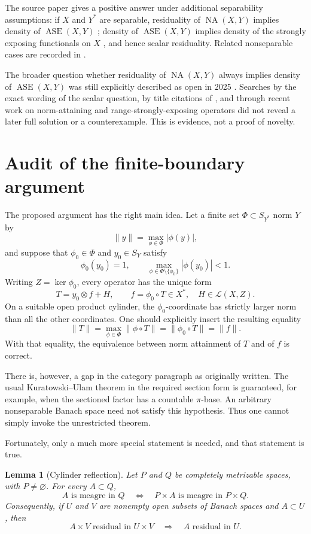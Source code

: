 \documentclass[11pt]{article}
\newtheorem{lemma}[theorem]{Lemma}
\theoremstyle{definition}
\theoremstyle{remark}
\newcommand{\NA}{\operatorname{NA}}
\newcommand{\ASE}{\operatorname{ASE}}
\newcommand{\calL}{\mathcal L}
\newcommand{\norm}[1]{\lVert #1\rVert}
\newcommand{\Sphere}{S}
\begin{document}
The source paper gives a positive answer under additional separability assumptions: if $X$ and $Y^*$ are separable, residuality of $\NA(X,Y)$ implies density of $\ASE(X,Y)$ \cite[Theorem~4.1]{JMRZ}; density of $\ASE(X,Y)$ implies density of the strongly exposing functionals on $X$ \cite[Proposition~1.5]{JMRZ}, and hence scalar residuality.  Related nonseparable cases are recorded in \cite[Remark~4.3]{JMRZ}.

The broader question whether residuality of $\NA(X,Y)$ always implies density of $\ASE(X,Y)$ was still explicitly described as open in 2025 \cite[after Corollary~2.18]{RSE}.  Searches by the exact wording of the scalar question, by title citations of \cite{JMRZ}, and through recent work on norm-attaining and range-strongly-exposing operators did not reveal a later full solution or a counterexample.  This is evidence, not a proof of novelty.

\section{Audit of the finite-boundary argument}

The proposed argument has the right main idea.  Let a finite set $\Phi\subset \Sphere_{Y^*}$ norm $Y$ by
\[
 \norm{y}=\max_{\phi\in\Phi}|\phi(y)|,
\]
and suppose that $\phi_0\in\Phi$ and $y_0\in\Sphere_Y$ satisfy
\[
 \phi_0(y_0)=1,
 \qquad
 \max_{\phi\in\Phi\setminus\{\phi_0\}}|\phi(y_0)|<1.
\]
Writing $Z=\ker\phi_0$, every operator has the unique form
\[
 T=y_0\otimes f+H,
 \qquad f=\phi_0\circ T\in X^*,\quad H\in\calL(X,Z).
\]
On a suitable open product cylinder, the $\phi_0$-coordinate has strictly larger norm than all the other coordinates.  One should explicitly insert the resulting equality
\[
 \norm{T}=\max_{\phi\in\Phi}\norm{\phi\circ T}
          =\norm{\phi_0\circ T}=\norm f.
\]
With that equality, the equivalence between norm attainment of $T$ and of $f$ is correct.

There is, however, a gap in the category paragraph as originally written.  The usual Kuratowski--Ulam theorem in the required section form is guaranteed, for example, when the sectioned factor has a countable $\pi$-base.  An arbitrary nonseparable Banach space need not satisfy this hypothesis.  Thus one cannot simply invoke the unrestricted theorem.

Fortunately, only a much more special statement is needed, and that statement is true.

\begin{lemma}[Cylinder reflection]\label{lem:cylinder}
Let $P$ and $Q$ be completely metrizable spaces, with $P\ne\varnothing$.  For every $A\subset Q$,
\[
 A\text{ is meagre in }Q
 \quad\Longleftrightarrow\quad
 P\times A\text{ is meagre in }P\times Q.
\]
Consequently, if $U$ and $V$ are nonempty open subsets of Banach spaces and $A\subset U$, then
\[
 A\times V\text{ residual in }U\times V
 \quad\Longrightarrow\quad
 A\text{ residual in }U.
\]
\end{lemma}
\end{document}

